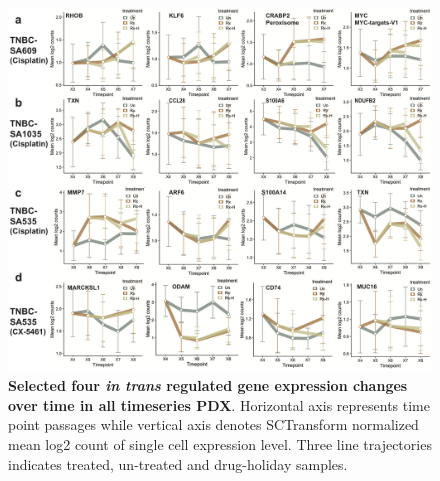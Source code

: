 \begin{figure}
\centering
 \includegraphics[width=\textwidth]{Figures/chap5/old/Intransgenelinetrajectories.png}
	
\caption[Four \textit{in trans} gene expression changed over time]
	{\small
	 \textbf{Selected four \textit{in trans} regulated gene expression changes over time in all timeseries PDX}.
	Horizontal axis represents time point passages while vertical axis denotes SCTransform normalized mean log2 count of single cell expression level. Three line trajectories indicates treated, un-treated and drug-holiday samples. }

	\label{fig:Intransgenelinetrajectories}
\end{figure} 

